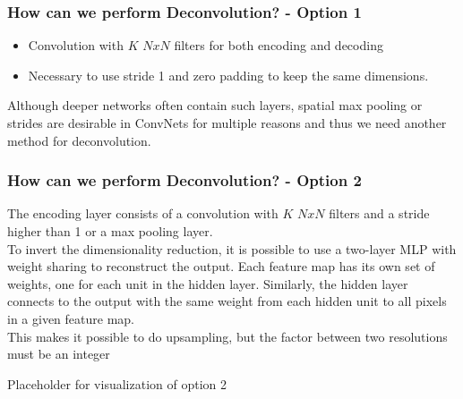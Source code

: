 \documentclass{beamer}
\begin{document}
\begin{frame}
\frametitle{How can we perform Deconvolution? - Option 1}
\begin{itemize}
\item Convolution with $K$ $NxN$ filters for both encoding and decoding
\item Necessary to use stride 1 and zero padding to keep the same dimensions.
\end{itemize}  \vspace{4mm}
Although deeper networks often contain such layers, spatial max pooling or strides are desirable in ConvNets for multiple reasons and thus we need another method for deconvolution.
\end{frame}

\begin{frame}
\frametitle{How can we perform Deconvolution? - Option 2}

The encoding layer consists of a convolution with $K$ $NxN$ filters and a stride higher than 1 or a max pooling layer.
\\ \vspace{4mm}
To invert the dimensionality reduction, it is possible to use a two-layer MLP with weight sharing to reconstruct the output. Each feature map has its own set of weights, one for each unit in the hidden layer. Similarly, the hidden layer connects to the output with the same weight from each hidden unit to all pixels in a given feature map.
\\ \vspace{4mm}
This makes it possible to do upsampling, but the factor between two resolutions must be an integer



\end{frame}

\begin{frame}
Placeholder for visualization of option 2
\end{frame}
\end{document}
